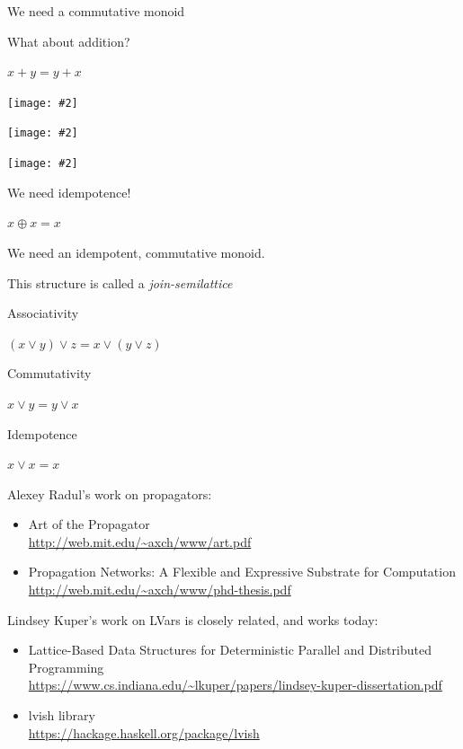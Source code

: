 \documentclass[usenames,dvipsnames,svgnames,table,aspectratio=1610,mathserif]{beamer}
\newcommand{\nl}{\vspace{\baselineskip}}
\newcommand{\textslide}[1]{{
\begin{frame}
\begin{center}

#1

\end{center}
\end{frame}
}}
\newcommand{\textslideleft}[1]{{
\begin{frame}

#1

\end{frame}
}}
\newcommand{\imageslide}[2][1]{{
\begin{frame}\begin{center}
\texttt{[image: \#2]}
\end{center}\end{frame}
}}
\begin{document}
\textslide{\Large{
We need a commutative monoid

What about addition?

\nl

$x + y = y + x$
}}

\imageslide[0.6]{doubleplus15.pdf}
\imageslide[0.6]{doubleplus16.pdf}
\imageslide[0.6]{doubleplus17.pdf}



\textslide{\Large{
We need idempotence!

\nl

$x \oplus x = x$

}}

\textslide{\Large{

We need an idempotent, commutative monoid.

This structure is called a {\it join-semilattice}

\nl

Associativity

$(x \vee y) \vee z = x \vee (y \vee z)$
\nl

Commutativity

$x \vee y = y \vee x$
\nl

Idempotence

$x \vee x = x$

}}



\begin{frame}

Alexey Radul's work on propagators:

\begin{itemize}
\item Art of the Propagator \\
      \url{http://web.mit.edu/~axch/www/art.pdf}
\item Propagation Networks: A Flexible and Expressive Substrate for Computation \\
      \url{http://web.mit.edu/~axch/www/phd-thesis.pdf}
\end{itemize}
\end{frame}


\textslideleft{

Lindsey Kuper's work on LVars is closely related, and works today:

\begin{itemize}
\item Lattice-Based Data Structures for Deterministic Parallel and Distributed Programming \\
      \url{https://www.cs.indiana.edu/~lkuper/papers/lindsey-kuper-dissertation.pdf}
\item lvish library \\
      \url{https://hackage.haskell.org/package/lvish}
\end{itemize}

}
\end{document}
